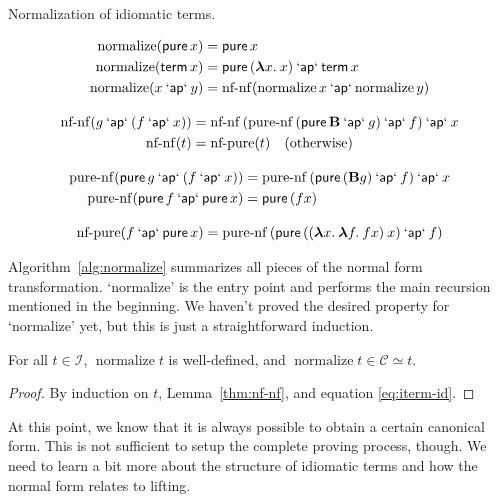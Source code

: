 \begin{algorithm}[t]
\caption{Normalization of idiomatic terms.}
\label{alg:normalize}
\begin{gather*}
	\begin{align*}
		\operatorname{normalize}(\operatorname{\mathsf{pure}} x) &= \operatorname{\mathsf{pure}} x \\
		\operatorname{normalize}(\operatorname{\mathsf{term}} x) &= \operatorname{\mathsf{pure}}{({\boldsymbol\lambda} x.\>x)} \mathbin{\mathsf{`ap`}} \operatorname{\mathsf{term}} x \\
		\operatorname{normalize}(x \mathbin{\mathsf{`ap`}} y) &=
			\operatorname{nf-nf}(\operatorname{normalize} x \mathbin{\mathsf{`ap`}} \operatorname{normalize} y)
	\end{align*} \\[2ex]
	\begin{align*}
		\operatorname{nf-nf}(g \mathbin{\mathsf{`ap`}} (f \mathbin{\mathsf{`ap`}} x)) &=
			\operatorname{nf-nf}{(\operatorname{pure-nf}{(\operatorname{\mathsf{pure}} \mathbf{B} \mathbin{\mathsf{`ap`}} g)} \mathbin{\mathsf{`ap`}} f)} \mathbin{\mathsf{`ap`}} x \\
		\operatorname{nf-nf}(t) &= \operatorname{nf-pure}(t) \quad\text{(otherwise)}
	\end{align*} \\[2ex]
	\begin{align*}
		\operatorname{pure-nf}(\operatorname{\mathsf{pure}} g \mathbin{\mathsf{`ap`}} (f \mathbin{\mathsf{`ap`}} x)) &=
			\operatorname{pure-nf}{(\operatorname{\mathsf{pure}}{(\mathbf{B} g)} \mathbin{\mathsf{`ap`}} f)} \mathbin{\mathsf{`ap`}} x \\
		\operatorname{pure-nf}(\operatorname{\mathsf{pure}} f \mathbin{\mathsf{`ap`}} \operatorname{\mathsf{pure}} x) &= \operatorname{\mathsf{pure}}{(f x)}
	\end{align*} \\[2ex]
	\operatorname{nf-pure}(f \mathbin{\mathsf{`ap`}} \operatorname{\mathsf{pure}} x) =
		\operatorname{pure-nf}{(\operatorname{\mathsf{pure}}{(({\boldsymbol\lambda} x.\>{\boldsymbol\lambda} f.\>f x) \> x)} \mathbin{\mathsf{`ap`}} f)}
\end{gather*}
\end{algorithm}

Algorithm~\ref{alg:normalize} summarizes all pieces of the normal form
transformation.
`normalize' is the entry point and performs the main recursion mentioned in the
beginning.
We haven't proved the desired property for `normalize' yet, but this is just a
straightforward induction.

\begin{lemma}\label{thm:normalize}
For all $t \in \mathcal{I}$, $\operatorname{normalize} t$ is well-defined, and
$\operatorname{normalize} t \in \mathcal{C} \simeq t$.
\end{lemma}
\begin{proof}
By induction on $t$, Lemma~\ref{thm:nf-nf}, and equation \eqref{eq:iterm-id}.
\end{proof}

At this point, we know that it is always possible to obtain a certain canonical
form.
This is not sufficient to setup the complete proving process, though.
We need to learn a bit more about the structure of idiomatic terms and how the
normal form relates to lifting.

